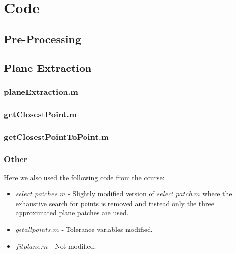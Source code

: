 \section{Code}
\subsection{Pre-Processing}\label{PreProcessingCode}



\subsection{Plane Extraction}\label{PlaneExtractionCode}

\subsubsection{planeExtraction.m}\label{planeExtractionCode}


\subsubsection{getClosestPoint.m}\label{getClosestPointCode}


\subsubsection{getClosestPointToPoint.m}\label{getClosestPointToPointCode}


\subsubsection{Other}\label{OtherCode}
Here we also used the following code from the course:
\begin{itemize}
	\item $select\_patches.m$ - Slightly modified version of $select\_patch.m$ where the exhaustive search for points is removed and instead only the three approximated plane patches are used.
	\item $getallpoints.m$ - Tolerance variables modified.
	\item $fitplane.m$ - Not modified.
\end{itemize}

